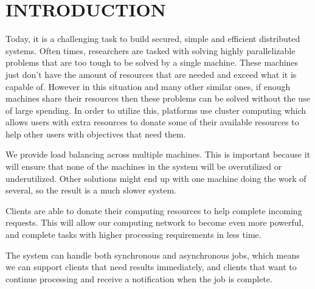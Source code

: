 \section{INTRODUCTION}\label{sec:introduction}

Today, it is a challenging task to build secured, simple and efficient distributed systems. Often times, researchers are tasked with solving highly parallelizable problems that are too tough to be solved by a single machine. These machines just don’t have the amount of resources that are needed and exceed what it is capable of. However in this situation and many other similar ones, if enough machines share their resources then these problems can be solved without the use of large spending. In order to utilize this, platforms use cluster computing which allows users with extra resources to donate some of their available resources to help other users with objectives that need them.

We provide load balancing across multiple machines. This is important because it will ensure that none of the machines in the system will be overutilized or underutilized. Other solutions might end up with one machine doing the work of several, so the result is a much slower system.

Clients are able to donate their computing resources to help complete incoming requests. This will allow our computing network to become even more powerful, and complete tasks with higher processing requirements in less time.

The system can handle both synchronous and asynchronous jobs, which means we can support clients that need results immediately, and clients that want to continue processing and receive a notification when the job is complete.